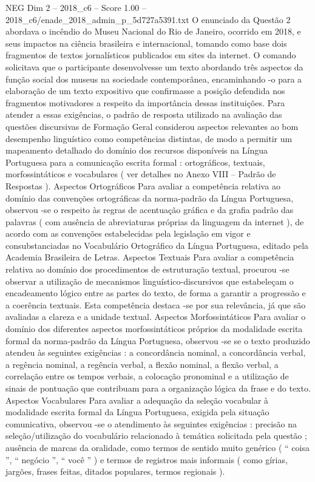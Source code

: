 \begin{textsample}{NEG Dim 2 – 2018\_c6 – Score 1.00 – 2018\_c6/enade\_2018\_admin\_p\_5d727a5391.txt}
O enunciado da Questão 2 abordava o incêndio do Museu Nacional do Rio de Janeiro, ocorrido em 2018, e seus impactos na ciência brasileira e internacional, tomando como base dois fragmentos de textos jornalísticos publicados em sites da internet.
O comando solicitava que o participante desenvolvesse um texto abordando três aspectos da função social dos museus na sociedade contemporânea, encaminhando -o para a elaboração de um texto expositivo que confirmasse a posição defendida nos fragmentos motivadores a respeito da importância dessas instituições.
Para atender a essas exigências, o padrão de resposta utilizado na avaliação das questões discursivas de Formação Geral considerou aspectos relevantes ao bom desempenho linguístico como competências distintas, de modo a permitir um mapeamento detalhado do domínio dos recursos disponíveis na Língua Portuguesa para a comunicação escrita formal : ortográficos, textuais, morfossintáticos e vocabulares ( ver detalhes no Anexo VIII – Padrão de Respostas ).
Aspectos Ortográficos Para avaliar a competência relativa ao domínio das convenções ortográficas da norma-padrão da Língua Portuguesa, observou -se o respeito às regras de acentuação gráfica e da grafia padrão das palavras ( com ausência de abreviaturas próprias da linguagem da internet ), de acordo com as convenções estabelecidas pela legislação em vigor e consubstanciadas no Vocabulário Ortográfico da Língua Portuguesa, editado pela Academia Brasileira de Letras.
Aspectos Textuais Para avaliar a competência relativa ao domínio dos procedimentos de estruturação textual, procurou -se observar a utilização de mecanismos linguístico-discursivos que estabeleçam o encadeamento lógico entre as partes do texto, de forma a garantir a progressão e a coerência textuais.
Esta competência destaca -se por sua relevância, já que são avaliadas a clareza e a unidade textual.
Aspectos Morfossintáticos Para avaliar o domínio dos diferentes aspectos morfossintáticos próprios da modalidade escrita formal da norma-padrão da Língua Portuguesa, observou -se se o texto produzido atendeu às seguintes exigências : a concordância nominal, a concordância verbal, a regência nominal, a regência verbal, a flexão nominal, a flexão verbal, a correlação entre os tempos verbais, a colocação pronominal e a utilização de sinais de pontuação que contribuam para a organização lógica da frase e do texto.
Aspectos Vocabulares Para avaliar a adequação da seleção vocabular à modalidade escrita formal da Língua Portuguesa, exigida pela situação comunicativa, observou -se o atendimento às seguintes exigências : precisão na seleção/utilização do vocabulário relacionado à temática solicitada pela questão ; ausência de marcas da oralidade, como termos de sentido muito genérico ( “ coisa ”, “ negócio ”, “ você ” ) e termos de registros mais informais ( como gírias, jargões, frases feitas, ditados populares, termos regionais ).

\end{textsample}
